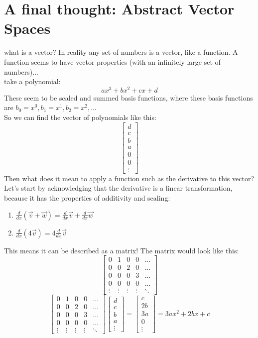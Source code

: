 \documentclass{article}
\begin{document}
\section{A final thought: Abstract Vector Spaces}
what is a vector? In reality any set of numbers is a vector, like a function. A function seems to have vector properties (with an infinitely large set of numbers)...\\
take a polynomial:
\[ax^{3} +bx^{2}+cx+d
\]
These seem to be scaled and summed basis functions, where these basis functions are $b_{0}=x^{0},b_{1}=x^{1},b_{2}=x^{2},\dots$\\
So we can find the vector of polynomials like this:
\[\begin{bmatrix}
    d\\
    c\\
    b\\
    a\\
    0\\0\\
    \vdots
\end{bmatrix}
\]
Then what does it mean to apply a function such as the derivative to this vector? Let's start by acknowledging that the derivative is a linear transformation, because it has the properties of additivity and scaling:\\
\begin{enumerate}
    \item $\frac{d}{dx}(\vec{v}+\vec{w}) = \frac{d}{dx}\vec{v}+\frac{d}{dx}\vec{w}$
    \item $\frac{d}{dx}(4\vec{v}) = 4\frac{d}{dx}\vec{v}$
\end{enumerate}
This means it can be described as a matrix! The matrix would look like this:
\[
\begin{bmatrix}
    0&1&0&0&\dots\\
    0&0&2&0&\dots\\
    0&0&0&3&\dots\\
    0&0&0&0&\dots\\
    \vdots&\vdots&\vdots&\vdots&\ddots
\end{bmatrix}
\]
\[\begin{bmatrix}
    0&1&0&0&\dots\\
    0&0&2&0&\dots\\
    0&0&0&3&\dots\\
    0&0&0&0&\dots\\
    \vdots&\vdots&\vdots&\vdots&\ddots
\end{bmatrix}
\begin{bmatrix}
    d\\
    c\\
    b\\
    a\\
    \vdots
\end{bmatrix}=
\begin{bmatrix}
    c\\
    2b\\
    3a\\
    0\\
    \vdots
\end{bmatrix}
=3ax^{2}+2bx+c
\]
\end{document}
